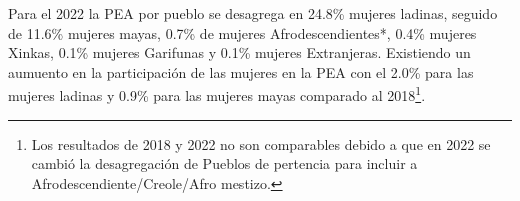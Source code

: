 Para el 2022 la PEA por pueblo se desagrega en 24.8\% mujeres ladinas, seguido de 11.6\% mujeres mayas, 0.7\% de mujeres Afrodescendientes*, 0.4\% mujeres Xinkas, 0.1\% mujeres Garifunas y 0.1\% mujeres Extranjeras. Existiendo un aumuento en la participación de las mujeres en la PEA con el 2.0\% para las mujeres ladinas y 0.9\% para las mujeres mayas comparado al 2018\footnote{Los resultados de 2018 y 2022 no son comparables debido a que en 2022 se cambió la desagregación de Pueblos de pertencia para incluir a Afrodescendiente/Creole/Afro mestizo.}.
